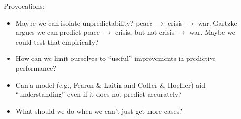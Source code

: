 \documentclass[aspectratio=169]{beamer}
\begin{document}
\begin{frame}

Provocations:
\begin{itemize}
\item Maybe we can isolate unpredictability? peace $\rightarrow$ crisis $\rightarrow$ war.  Gartzke argues we can predict peace $\rightarrow$ crisis, but not crisis $\rightarrow$ war.  Maybe we could test that empirically?
\pause
\item How can we limit ourselves to ``useful'' improvements in predictive performance?
\pause
\item Can a model (e.g., Fearon \& Laitin and Collier \& Hoefller) aid ``understanding'' even if it does not predict accurately?
\pause
\item What should we do when we can't just get more cases?
\end{itemize}

\end{frame}


\frame{\titlepage}
\end{document}
